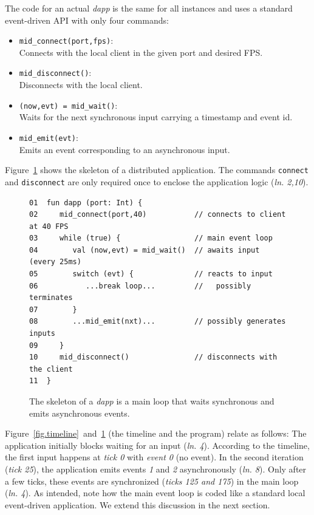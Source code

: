 \documentclass[sigplan,screen]{acmart}
\newcommand{\lin}[1]{(\emph{ln. #1}\xspace)}
\newcommand{\dapp}{\emph{dapp}\xspace}
\begin{document}
The code for an actual \dapp is the same for all instances and uses a standard
event-driven API with only four commands:
%
\begin{itemize}
\item \texttt{mid\_connect(port,fps)}:   \\Connects with the local client in the given port and desired FPS.
\item \texttt{mid\_disconnect()}:        \\Disconnects with the local client.
\item \texttt{(now,evt) = mid\_wait()}:  \\Waits for the next synchronous input carrying a timestamp and event id.
\item \texttt{mid\_emit(evt)}:           \\Emits an event corresponding to an asynchronous input.
\end{itemize}
%
Figure~\ref{fig.skel} shows the skeleton of a distributed application.
The commands \texttt{connect} and \texttt{disconnect} are only required once to
enclose the application logic \lin{2,10}.

\begin{figure}[t]
{\scriptsize
\begin{verbatim}
01  fun dapp (port: Int) {
02     mid_connect(port,40)           // connects to client at 40 FPS
03     while (true) {                 // main event loop
04        val (now,evt) = mid_wait()  // awaits input (every 25ms)
05        switch (evt) {              // reacts to input
06           ...break loop...         //   possibly terminates
07        }
08        ...mid_emit(nxt)...         // possibly generates inputs
09     }
10     mid_disconnect()               // disconnects with the client
11  }
\end{verbatim}
}
  \caption{
    \label{fig.skel}
    The skeleton of a \dapp is a main loop that waits synchronous and emits
    asynchronous events.
  }
\end{figure}

Figure~\ref{fig.timeline}~and~\ref{fig.skel} (the timeline and the program)
relate as follows:
The application initially blocks waiting for an input \lin{4}.
According to the timeline, the first input happens at \emph{tick 0} with
\emph{event 0} (no event).
In the second iteration (\emph{tick 25}), the application emits events \emph{1}
and \emph{2} asynchronously \lin{8}.
Only after a few ticks, these events are synchronized (\emph{ticks 125 and 175})
in the main loop \lin{4}.
As intended, note how the main event loop is coded like a standard local
event-driven application.
We extend this discussion in the next section.
\end{document}
